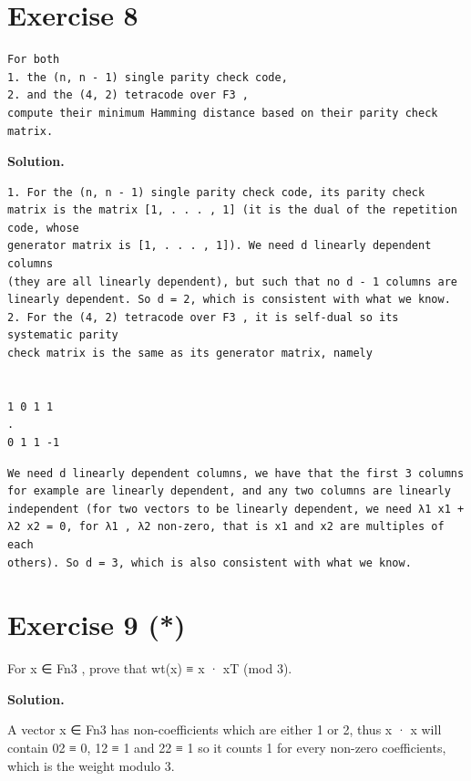 \documentclass[11pt]{article}
\begin{document}
\section*{Exercise 8}
\begin{exercisebox}
\begin{Verbatim}[fontsize=\small]
For both
1. the (n, n - 1) single parity check code,
2. and the (4, 2) tetracode over F3 ,
compute their minimum Hamming distance based on their parity check matrix.
\end{Verbatim}
\end{exercisebox}
\begin{solutionbox}
\textbf{Solution.}

\begin{Verbatim}[fontsize=\small]
1. For the (n, n - 1) single parity check code, its parity check
matrix is the matrix [1, . . . , 1] (it is the dual of the repetition code, whose
generator matrix is [1, . . . , 1]). We need d linearly dependent columns
(they are all linearly dependent), but such that no d - 1 columns are
linearly dependent. So d = 2, which is consistent with what we know.
2. For the (4, 2) tetracode over F3 , it is self-dual so its systematic parity
check matrix is the same as its generator matrix, namely


1 0 1 1
.
0 1 1 -1
\end{Verbatim}
\begin{Verbatim}[fontsize=\small]
We need d linearly dependent columns, we have that the first 3 columns
for example are linearly dependent, and any two columns are linearly
independent (for two vectors to be linearly dependent, we need λ1 x1 +
λ2 x2 = 0, for λ1 , λ2 non-zero, that is x1 and x2 are multiples of each
others). So d = 3, which is also consistent with what we know.
\end{Verbatim}
\end{solutionbox}
\section*{Exercise 9 (*)}
\begin{exercisebox}
For x ∈ Fn3 , prove that wt(x) ≡ x · xT (mod 3).

\end{exercisebox}
\begin{solutionbox}
\textbf{Solution.}

A vector x ∈ Fn3 has non-coefficients which are either 1 or 2, thus x · x will contain 02 ≡ 0, 12 ≡ 1 and 22 ≡ 1 so it counts 1 for every non-zero coefficients, which is the weight modulo 3.

\end{solutionbox}
\end{document}
